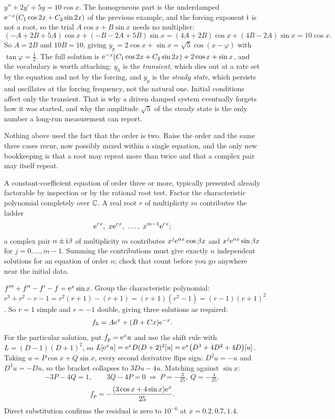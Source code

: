 \begin{worked}
$y''+2y'+5y=10\cos x$. The homogeneous part is the underdamped $\mathrm{e}^{-x}(C_1\cos2x+C_2\sin2x)$ of the previous example, and the forcing exponent $\mathrm{i}$ is not a root, so the trial $A\cos x+B\sin x$ needs no multiplier:
\[(-A+2B+5A)\cos x+(-B-2A+5B)\sin x=(4A+2B)\cos x+(4B-2A)\sin x=10\cos x.\]
So $A=2B$ and $10B=10$, giving $y_p=2\cos x+\sin x=\sqrt5\cos(x-\varphi)$ with $\tan\varphi=\tfrac12$. The full solution is $\mathrm{e}^{-x}(C_1\cos2x+C_2\sin2x)+2\cos x+\sin x$, and the vocabulary is worth attaching: $y_h$ is the \emph{transient}, which dies out at a rate set by the equation and not by the forcing, and $y_p$ is the \emph{steady state}, which persists and oscillates at the forcing frequency, not the natural one. Initial conditions affect only the transient. That is why a driven damped system eventually forgets how it was started, and why the amplitude $\sqrt5$ of the steady state is the only number a long-run measurement can report.
\end{worked}

Nothing above used the fact that the order is two. Raise the order and the same three cases recur, now possibly mixed within a single equation, and the only new bookkeeping is that a root may repeat more than twice and that a complex pair may itself repeat.

\cue A constant-coefficient equation of order three or more, typically presented already factorable by inspection or by the rational root test.
\method Factor the characteristic polynomial completely over $\mathbb{C}$. A real root $r$ of multiplicity $m$ contributes the ladder
\[\eu^{rx},\ x\eu^{rx},\ \ldots,\ x^{m-1}\eu^{rx};\]
a complex pair $\alpha\pm\mathrm{i}\beta$ of multiplicity $m$ contributes $x^{j}\mathrm{e}^{\alpha x}\cos\beta x$ and $x^{j}\mathrm{e}^{\alpha x}\sin\beta x$ for $j=0,\ldots,m-1$. Summing the contributions must give exactly $n$ independent solutions for an equation of order $n$; check that count before you go anywhere near the initial data.

\begin{worked}
$f'''+f''-f'-f=\mathrm{e}^{x}\sin x$. Group the characteristic polynomial: $r^{3}+r^{2}-r-1=r^{2}(r+1)-(r+1)=(r+1)(r^{2}-1)=(r-1)(r+1)^{2}$. So $r=1$ simple and $r=-1$ double, giving three solutions as required:
\[f_h=A\mathrm{e}^{x}+(B+Cx)\mathrm{e}^{-x}.\]
For the particular solution, put $f_p=\mathrm{e}^{x}u$ and use the shift rule with $L=(D-1)(D+1)^{2}$, so $L[\mathrm{e}^{x}u]=\mathrm{e}^{x}D(D+2)^{2}[u]=\mathrm{e}^{x}\bigl(D^{3}+4D^{2}+4D\bigr)[u]$. Taking $u=P\cos x+Q\sin x$, every second derivative flips sign: $D^{2}u=-u$ and $D^{3}u=-Du$, so the bracket collapses to $3Du-4u$. Matching against $\sin x$:
\[-3P-4Q=1,\qquad 3Q-4P=0\ \Longrightarrow\ P=-\tfrac{3}{25},\ Q=-\tfrac{4}{25},\]
\[f_p=-\frac{(3\cos x+4\sin x)\mathrm{e}^{x}}{25}.\]
Direct substitution confirms the residual is zero to $10^{-6}$ at $x=0.2,0.7,1.4$.
\end{worked}

